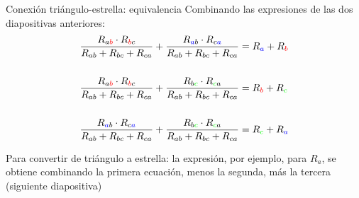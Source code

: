 \documentclass[aspectratio=169, xcolor={usenames,svgnames,dvipsnames}]{beamer}
\begin{document}

\begin{frame}{Conexión triángulo-estrella: \hspace{3mm}equivalencia}
Combinando las expresiones de las dos diapositivas anteriores:
    \begin{align*}
        \frac{R_{a{\color{red}b}} \cdot R_{{\color{red}b}c}}{R_{ab} + R_{bc} + R_{ca}} + \frac{R_{{\color{blue}a}b} \cdot R_{c{\color{blue}a}}}{R_{ab} + R_{bc} + R_{ca}} &= R_{\color{blue}a} + R_{\color{red}b}\\
        \\
        \frac{R_{a{\color{red}b}} \cdot R_{{\color{red}b}c}}{R_{ab} + R_{bc} + R_{ca}} + \frac{R_{b{\color{green}c}} \cdot R_{{\color{green}c}a}}{R_{ab} + R_{bc} + R_{ca}} &= R_{\color{red}b} + R_{\color{green}c}\\
        \\
        \frac{R_{{\color{blue}a}b} \cdot R_{c{\color{blue}a}}}{R_{ab} + R_{bc} + R_{ca}} + \frac{R_{b{\color{green}c}} \cdot R_{{\color{green}c}a}}{R_{ab} + R_{bc} + R_{ca}} &= R_{\color{green}c} + R_{\color{blue}a}
    \end{align*}
    
    Para \alert{convertir de triángulo a estrella}: la expresión, por ejemplo, para $R_a$, se obtiene combinando la primera ecuación, menos la segunda, más la tercera (siguiente diapositiva)
\end{frame}

\end{document}
